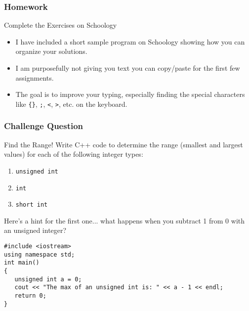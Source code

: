 \documentclass{beamer}
\begin{document}
\begin{frame}
\frametitle{Homework}
\begin{block}{Complete the Exercises on Schoology}
\begin{itemize}
    \item I have included a short sample program on Schoology showing how you can organize your solutions.
    \item I am purposefully not giving you text you can copy/paste for the first few assignments.
    \item The goal is to improve your typing, especially finding the special characters like \texttt{\{\}}, \texttt{;}, \texttt{<}, \texttt{>}, etc. on the keyboard.
\end{itemize}
\end{block}
\end{frame}

\begin{frame}[fragile]
\frametitle{Challenge Question}
\begin{exampleblock}{Find the Range!}
Write C++ code to determine the range (smallest and largest values) for each of the following integer types:
\begin{enumerate}
    \item \texttt{unsigned int}
    \item \texttt{int}
    \item \texttt{short int}
\end{enumerate}
Here's a hint for the first one... what happens when you subtract 1 from 0 with an unsigned integer?
\begin{verbatim}
#include <iostream>
using namespace std;
int main()
{
   unsigned int a = 0;
   cout << "The max of an unsigned int is: " << a - 1 << endl;
   return 0;
}
\end{verbatim}
\end{exampleblock}
\end{frame}
\end{document}
